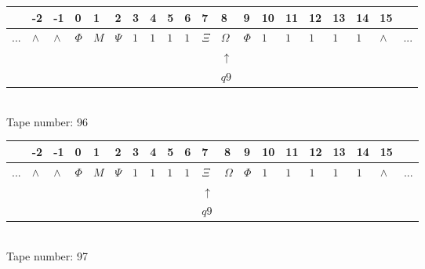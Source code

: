 \documentclass[11pt]{article}
\begin{document}
\begin{table}[H]
\centering
\begin{tabular}{llllllllllllllllllll}
 & -2 & -1 & 0 & 1 & 2 & 3 & 4 & 5 & 6 & 7 & 8 & 9 & 10 & 11 & 12 & 13 & 14 & 15 & \\
\hline
$...$ & \multicolumn{1}{|l|}{$\wedge$} & \multicolumn{1}{|l|}{$\wedge$} & \multicolumn{1}{|l|}{$\Phi$} & \multicolumn{1}{|l|}{$M$} & \multicolumn{1}{|l|}{$\Psi$} & \multicolumn{1}{|l|}{$1$} & \multicolumn{1}{|l|}{$1$} & \multicolumn{1}{|l|}{$1$} & \multicolumn{1}{|l|}{$1$} & \multicolumn{1}{|l|}{$\Xi$} & \multicolumn{1}{|l|}{$\Omega$} & \multicolumn{1}{|l|}{$\Phi$} & \multicolumn{1}{|l|}{$1$} & \multicolumn{1}{|l|}{$1$} & \multicolumn{1}{|l|}{$1$} & \multicolumn{1}{|l|}{$1$} & \multicolumn{1}{|l|}{$1$} & \multicolumn{1}{|l|}{$\wedge$} & $...$\\
\hline
&  &  &  &  &  &  &  &  &  &  & $\uparrow$ &  &  &  &  &  &  &  &  \\
&  &  &  &  &  &  &  &  &  &  & $ q9 $ &  &  &  &  &  &  &  &  \\
\end{tabular}
\\
Tape number: 96
\noindent\makebox[\linewidth]{\hdashrule{\textwidth}{1pt}{1pt}}\end{table}

\begin{table}[H]
\centering
\begin{tabular}{llllllllllllllllllll}
 & -2 & -1 & 0 & 1 & 2 & 3 & 4 & 5 & 6 & 7 & 8 & 9 & 10 & 11 & 12 & 13 & 14 & 15 & \\
\hline
$...$ & \multicolumn{1}{|l|}{$\wedge$} & \multicolumn{1}{|l|}{$\wedge$} & \multicolumn{1}{|l|}{$\Phi$} & \multicolumn{1}{|l|}{$M$} & \multicolumn{1}{|l|}{$\Psi$} & \multicolumn{1}{|l|}{$1$} & \multicolumn{1}{|l|}{$1$} & \multicolumn{1}{|l|}{$1$} & \multicolumn{1}{|l|}{$1$} & \multicolumn{1}{|l|}{$\Xi$} & \multicolumn{1}{|l|}{$\Omega$} & \multicolumn{1}{|l|}{$\Phi$} & \multicolumn{1}{|l|}{$1$} & \multicolumn{1}{|l|}{$1$} & \multicolumn{1}{|l|}{$1$} & \multicolumn{1}{|l|}{$1$} & \multicolumn{1}{|l|}{$1$} & \multicolumn{1}{|l|}{$\wedge$} & $...$\\
\hline
&  &  &  &  &  &  &  &  &  & $\uparrow$ &  &  &  &  &  &  &  &  &  \\
&  &  &  &  &  &  &  &  &  & $ q9 $ &  &  &  &  &  &  &  &  &  \\
\end{tabular}
\\
Tape number: 97
\noindent\makebox[\linewidth]{\hdashrule{\textwidth}{1pt}{1pt}}\end{table}
\end{document}
